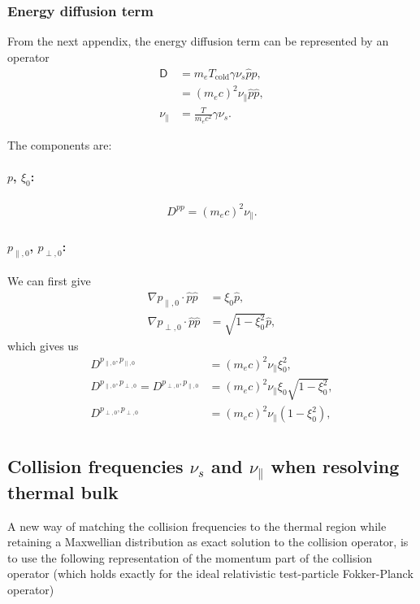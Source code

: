 \documentclass[11pt,a4paper]{article}
\newcommand{\sub}[1]{\ensuremath{_{\text{#1}}}}
\begin{document}
\subsubsection*{Energy diffusion term}
From the next appendix, the energy diffusion term can be represented by an operator
\begin{align}
\mathsf{D} &= m_e  T\sub{cold} \gamma \nu_s \hat{p}\hat{p}, \nonumber \\
&= (m_e c)^2 \nu_\parallel \hat{p}\hat{p} , \\
\nu_\parallel &= \frac{T}{m_e c^2}\gamma \nu_s .
\end{align}

The components are:

\paragraph{$p$, $\xi_0$:}
\begin{align}
D^{pp} = (m_e c)^2 \nu_\parallel .
\end{align}

\paragraph{$p_{\parallel,0}$, $p_{\perp,0}$:}
We can first give
\begin{align}
\nabla p_{\parallel,0} \cdot \hat{p}\hat{p} &= \xi_0 \hat{p} , \nonumber \\
\nabla p_{\perp,0} \cdot \hat{p}\hat{p} &= \sqrt{1-\xi_0^2}\hat{p},
\end{align}
which gives us
\begin{align}
D^{p_{\parallel,0},p_{\parallel,0}} &= (m_e c)^2 \nu_\parallel \xi_0^2, \nonumber \\
D^{p_{\parallel,0},p_{\perp,0}} = D^{p_{\perp,0},p_{\parallel,0}} &= (m_e c)^2 \nu_\parallel \xi_0\sqrt{1-\xi_0^2}, \nonumber \\
D^{p_{\perp,0},p_{\perp,0}} &= (m_e c)^2 \nu_\parallel(1- \xi_0^2), \nonumber \\
\end{align}

\subsection{Collision frequencies $\nu_s$ and $\nu_\parallel$ when resolving thermal bulk}
A new way of matching the collision frequencies to the thermal region while retaining a Maxwellian distribution as exact solution to the collision operator, is to use the following representation of the momentum part of the collision operator (which holds exactly for the ideal relativistic test-particle Fokker-Planck operator)
\end{document}
